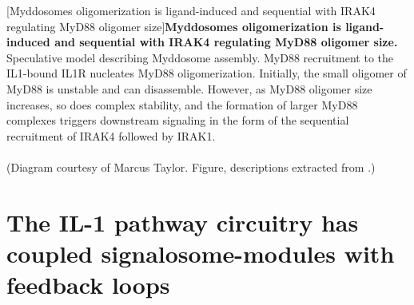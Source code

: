 \begin{centering}
\captionsetup{parbox=none}
[Myddosomes oligomerization is ligand-induced and sequential with IRAK4 regulating MyD88 oligomer size]{\textbf{Myddosomes oligomerization is ligand-induced and sequential with IRAK4 regulating MyD88 oligomer size.} Speculative model describing Myddosome assembly. MyD88 recruitment to the IL1-bound IL1R nucleates MyD88 oligomerization. Initially, the small oligomer of MyD88 is unstable and can disassemble. However, as MyD88 oligomer size increases, so does complex stability, and the formation of larger MyD88 complexes triggers downstream signaling in the form of the sequential recruitment of IRAK4 followed by IRAK1.
\\
\\
(Diagram courtesy of Marcus Taylor. Figure, descriptions extracted from \autocite{Deliz-Aguirre_2021}.)}
\label{p1:f7}
\end{centering}

\chapter{The IL-1 pathway circuitry has coupled signalosome-modules with feedback loops}
\label{chapter:p2}
